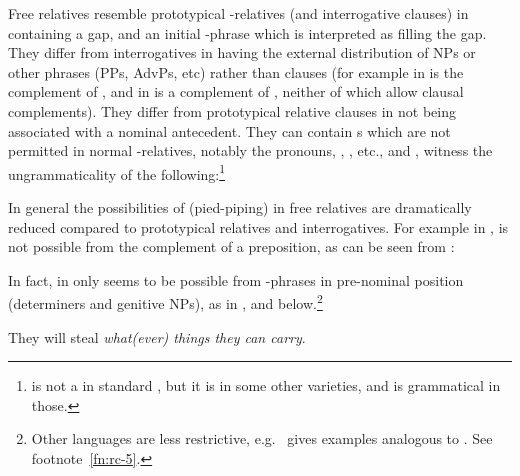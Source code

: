 \documentclass[output=paper
 	        ,biblatex
                ,babelshorthands
                ,newtxmath
                ,draftmode
                ,colorlinks, citecolor=brown
]{langscibook}
\begin{document}
Free relatives resemble prototypical -relatives (and interrogative clauses) in containing a
gap, and an initial -phrase which is interpreted as filling the gap.  They
differ from interrogatives in having  the external
distribution of NPs or other phrases (\eguk PPs, AdvPs, etc) rather than clauses (for example in   is the complement of , and in  
is a complement of , neither of which allow clausal complements). They differ
from prototypical relative clauses in not being associated with a nominal antecedent. They can
contain s which are not permitted in normal -relatives, notably the
 pronouns, , , etc., and , witness the
ungrammaticality of the following:\footnote{ is not a  in
  standard , but it is in some other varieties, and  is grammatical in
  those.}
\begin{exe}\ex\begin{xlist}\label{x:rc-144}
\end{xlist}\end{exe}
In general the possibilities of  (pied-piping) in free relatives are
dramatically reduced compared to prototypical relatives and interrogatives. For example in , 
 is not possible from the complement of a preposition, as can be seen
from :
\begin{exe}\ex\begin{xlist}
\end{xlist}\end{exe}
In fact, in    only seems to be possible from -phrases in pre-nominal position
(determiners and genitive NPs), as in , and  below.\footnote{Other
  languages are less restrictive, e.g.\ \citet[57]{Mueller99b} gives  examples
  analogous to . See footnote~\ref{fn:rc-5}.}
\begin{exe}\ex
  \label{x:rc-149} They will steal \emph{what(ever) things they can carry}.
\end{exe}
\end{document}
